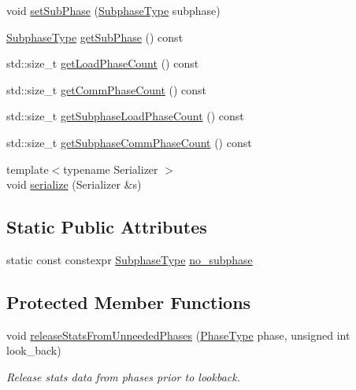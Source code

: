 \begin{DoxyCompactItemize}
\item 
void \hyperlink{structvt_1_1elm_1_1_element_stats_a8dd033cd3aba13f35212db30a7b8db2f}{set\+Sub\+Phase} (\hyperlink{namespacevt_ae78cbfdf1e57470e33eedb074f2beeba}{Subphase\+Type} subphase)
\item 
\hyperlink{namespacevt_ae78cbfdf1e57470e33eedb074f2beeba}{Subphase\+Type} \hyperlink{structvt_1_1elm_1_1_element_stats_ae9e567cc2429fd42046472282811daa9}{get\+Sub\+Phase} () const
\item 
std\+::size\+\_\+t \hyperlink{structvt_1_1elm_1_1_element_stats_a0578b01b6a0f7aee29ad57676ee9073b}{get\+Load\+Phase\+Count} () const
\item 
std\+::size\+\_\+t \hyperlink{structvt_1_1elm_1_1_element_stats_a14daf54c633594bccdf408d8e0053792}{get\+Comm\+Phase\+Count} () const
\item 
std\+::size\+\_\+t \hyperlink{structvt_1_1elm_1_1_element_stats_ad89dc198f43e9eaaff095b9d0130d4c1}{get\+Subphase\+Load\+Phase\+Count} () const
\item 
std\+::size\+\_\+t \hyperlink{structvt_1_1elm_1_1_element_stats_a7295efd869a1e7dca133ecb87ba9df25}{get\+Subphase\+Comm\+Phase\+Count} () const
\item 
{\footnotesize template$<$typename Serializer $>$ }\\void \hyperlink{structvt_1_1elm_1_1_element_stats_a9885636f2cd035d7df0529390fb9b7ba}{serialize} (Serializer \&s)
\end{DoxyCompactItemize}
\subsection*{Static Public Attributes}
\begin{DoxyCompactItemize}
\item 
static const constexpr \hyperlink{namespacevt_ae78cbfdf1e57470e33eedb074f2beeba}{Subphase\+Type} \hyperlink{structvt_1_1elm_1_1_element_stats_a6d338e3acd9504dc88d6664a24e567ce}{no\+\_\+subphase}
\end{DoxyCompactItemize}
\subsection*{Protected Member Functions}
\begin{DoxyCompactItemize}
\item 
void \hyperlink{structvt_1_1elm_1_1_element_stats_ab6abdce753149b261fd238392cc927c8}{release\+Stats\+From\+Unneeded\+Phases} (\hyperlink{namespacevt_a46ce6733d5cdbd735d561b7b4029f6d7}{Phase\+Type} phase, unsigned int look\+\_\+back)
\begin{DoxyCompactList}\small\item\em Release stats data from phases prior to lookback. \end{DoxyCompactList}\end{DoxyCompactItemize}
